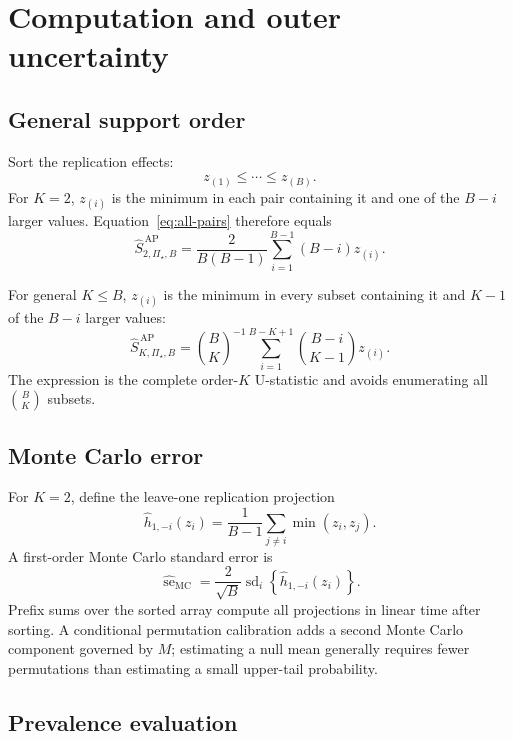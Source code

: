 \documentclass[11pt]{article}
\newcommand{\PSet}{\Pi_\star}
\theoremstyle{remark}
\begin{document}
\section{Computation and outer uncertainty}
\label{app:computation}

\subsection{General support order}

Sort the replication effects:
\[
z_{(1)}\leq\cdots\leq z_{(B)}.
\]
For $K=2$, $z_{(i)}$ is the minimum in each pair containing it and one of the $B-i$ larger values. Equation~\eqref{eq:all-pairs} therefore equals
\begin{equation}
\widehat S_{2,\PSet,B}^{\,\mathrm{AP}}
=
\frac{2}{B(B-1)}
\sum_{i=1}^{B-1}(B-i)z_{(i)}.
\label{eq:sorted-k2}
\end{equation}

For general $K\leq B$, $z_{(i)}$ is the minimum in every subset containing it and $K-1$ of the $B-i$ larger values:
\begin{equation}
\widehat S_{K,\PSet,B}^{\,\mathrm{AP}}
=
\binom BK^{-1}
\sum_{i=1}^{B-K+1}
\binom{B-i}{K-1}z_{(i)}.
\label{eq:sorted-k}
\end{equation}
The expression is the complete order-$K$ U-statistic and avoids enumerating all $\binom BK$ subsets.

\subsection{Monte Carlo error}

For $K=2$, define the leave-one replication projection
\[
\widehat h_{1,-i}(z_i)
=
\frac1{B-1}\sum_{j\ne i}\min(z_i,z_j).
\]
A first-order Monte Carlo standard error is
\begin{equation}
\widehat{\operatorname{se}}_{\mathrm{MC}}
=
\frac2{\sqrt B}
\operatorname{sd}_{i}
\left\{
\widehat h_{1,-i}(z_i)
\right\}.
\label{eq:mcse}
\end{equation}
Prefix sums over the sorted array compute all projections in linear time after sorting. A conditional permutation calibration adds a second Monte Carlo component governed by $M$; estimating a null mean generally requires fewer permutations than estimating a small upper-tail probability.

\subsection{Prevalence evaluation}
\end{document}
